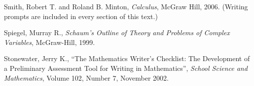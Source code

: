\begin{thebibliography}{99}
  Smith, Robert T. and Roland B. Minton, \emph{Calculus}, McGraw Hill, 2006. (Writing prompts are included in every section of this text.)

    Spiegel, Murray R., \emph{Schaum's Outline of Theory and Problems of Complex Variables}, McGraw-Hill, 1999.

   Stonewater, Jerry K., ``The Mathematics Writer's Checklist:  The Development of a Preliminary Assessment Tool for Writing in Mathematics'',\emph{ School Science and Mathematics}, Volume 102, Number 7, November 2002.



\end{thebibliography}


